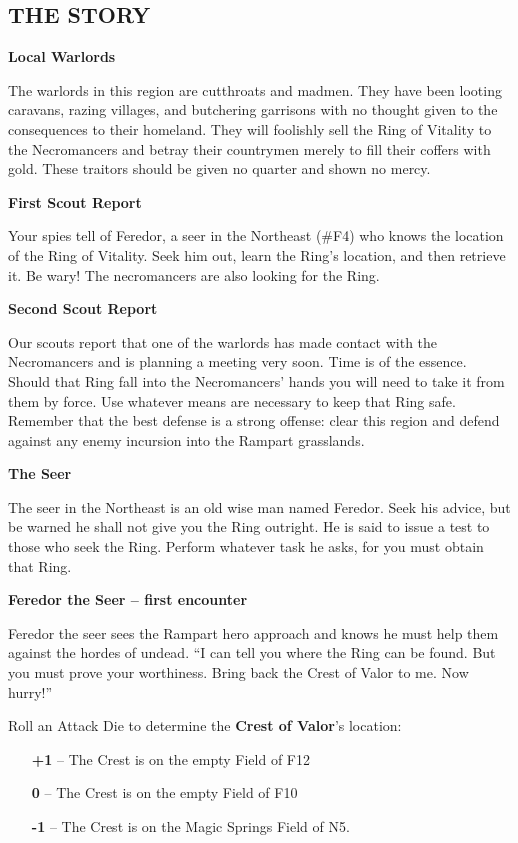 \vspace{32em}
\begin{multicols*}{2}
\subsection*{\MakeUppercase{The Story}}

\textbf{Local Warlords}

The warlords in this region are cutthroats and madmen.
They have been looting caravans, razing villages, and butchering garrisons with no thought given to the consequences to their homeland.
They will foolishly sell the Ring of Vitality to the Necromancers and betray their countrymen merely to fill their coffers with gold.
These traitors should be given no quarter and shown no mercy.

\textbf{First Scout Report}

Your spies tell of Feredor, a seer in the Northeast (\#F4) who knows the location of the Ring of Vitality.
Seek him out, learn the Ring's location, and then retrieve it.
Be wary!
The necromancers are also looking for the Ring.

\textbf{Second Scout Report}

Our scouts report that one of the warlords has made contact with the Necromancers and is planning a meeting very soon.
Time is of the essence.
Should that Ring fall into the Necromancers' hands you will need to take it from them by force.
Use whatever means are necessary to keep that Ring safe.
Remember that the best defense is a strong offense: clear this region and defend against any enemy incursion into the Rampart grasslands.

\textbf{The Seer}

The seer in the Northeast is an old wise man named Feredor.
Seek his advice, but be warned he shall not give you the Ring outright.
He is said to issue a test to those who seek the Ring.
Perform whatever task he asks, for you must obtain that Ring.

\textbf{Feredor the Seer -- first encounter}

Feredor the seer sees the Rampart hero approach and knows he must help them against the hordes of undead.
``I can tell you where the Ring can be found.
But you must prove your worthiness.
Bring back the Crest of Valor to me. Now hurry!''

\textcolor{darkcandyapplered}{Roll an Attack Die to determine the \textbf{Crest of Valor}'s location:}
\begin{itemize}
  \item[\textbf{+1}] -- The Crest is on the empty Field of F12
  \item[\textbf{0}] -- The Crest is on the empty Field of F10
  \item[\textbf{-1}] -- The Crest is on the Magic Springs Field of N5.
\end{itemize}


\end{multicols*}

